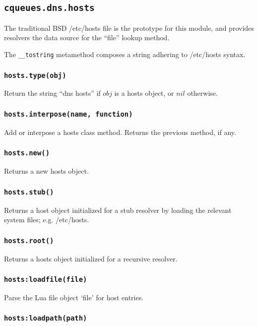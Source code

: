 \documentclass[11pt, oneside]{memoir}
\newcommand{\routine}[1]{\texttt{#1} }
\newcommand{\fn}[1]{\texttt{#1} }
\newcounter{toccols}
\newenvironment{Module}[1]{
	\subsection{\texttt{#1}}
	\addtocontents{toc}{
		\protect\begin{multicols}{\value{toccols}}
	}
}{
	\addtocontents{toc}{\protect\end{multicols}}
}
\begin{document}
\begin{Module}{cqueues.dns.hosts}

The traditional BSD /etc/hosts file is the prototype for this module, and provides resolvers the data source for the ``file'' lookup method.

The \fn{\_\_tostring} metamethod composes a string adhering to /etc/hosts syntax.

\subsubsection[\routine{hosts.type}]{\routine{hosts.type(obj)}}
Return the string ``dns hosts'' if $obj$ is a hosts object, or $nil$ otherwise.

\subsubsection[\fn{hosts.interpose}]{\fn{hosts.interpose(name, function)}}

Add or interpose a hosts class method. Returns the previous method, if any.

\subsubsection[\fn{hosts.new}]{\fn{hosts.new()}}

Returns a new hosts object.

\subsubsection[\fn{hosts.stub}]{\fn{hosts.stub()}}

Returns a host object initialized for a stub resolver by loading the relevant system files; e.g. /etc/hosts.

\subsubsection[\fn{hosts.root}]{\fn{hosts.root()}}

Returns a hosts object initialized for a recursive resolver.

\subsubsection[\fn{hosts:loadfile}]{\fn{hosts:loadfile(file)}}

Parse the Lua file object `file' for host entries.

\subsubsection[\fn{hosts:loadpath}]{\fn{hosts:loadpath(path)}}


\end{Module}
\end{document}
